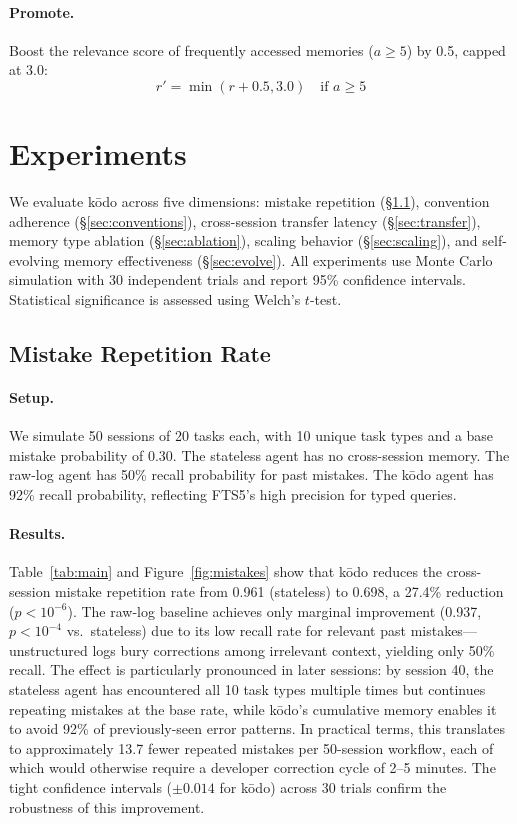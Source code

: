 \documentclass{article}
\begin{document}
\paragraph{Promote.} Boost the relevance score of frequently accessed memories ($a \geq 5$) by 0.5, capped at 3.0:
\begin{equation}
    r' = \min(r + 0.5, 3.0) \quad \text{if } a \geq 5
    \label{eq:promote}
\end{equation}

\section{Experiments}
\label{sec:experiments}

We evaluate k\=odo across five dimensions: mistake repetition (\S\ref{sec:mistakes}), convention adherence (\S\ref{sec:conventions}), cross-session transfer latency (\S\ref{sec:transfer}), memory type ablation (\S\ref{sec:ablation}), scaling behavior (\S\ref{sec:scaling}), and self-evolving memory effectiveness (\S\ref{sec:evolve}). All experiments use Monte Carlo simulation with 30 independent trials and report 95\% confidence intervals. Statistical significance is assessed using Welch's $t$-test.

\subsection{Mistake Repetition Rate}
\label{sec:mistakes}

\paragraph{Setup.} We simulate 50 sessions of 20 tasks each, with 10 unique task types and a base mistake probability of 0.30. The stateless agent has no cross-session memory. The raw-log agent has 50\% recall probability for past mistakes. The k\=odo agent has 92\% recall probability, reflecting FTS5's high precision for typed queries.

\paragraph{Results.} Table~\ref{tab:main} and Figure~\ref{fig:mistakes} show that k\=odo reduces the cross-session mistake repetition rate from 0.961 (stateless) to 0.698, a 27.4\% reduction ($p < 10^{-6}$). The raw-log baseline achieves only marginal improvement (0.937, $p < 10^{-4}$ vs.\ stateless) due to its low recall rate for relevant past mistakes---unstructured logs bury corrections among irrelevant context, yielding only 50\% recall. The effect is particularly pronounced in later sessions: by session 40, the stateless agent has encountered all 10 task types multiple times but continues repeating mistakes at the base rate, while k\=odo's cumulative memory enables it to avoid 92\% of previously-seen error patterns. In practical terms, this translates to approximately 13.7 fewer repeated mistakes per 50-session workflow, each of which would otherwise require a developer correction cycle of 2--5 minutes. The tight confidence intervals ($\pm 0.014$ for k\=odo) across 30 trials confirm the robustness of this improvement.
\end{document}
